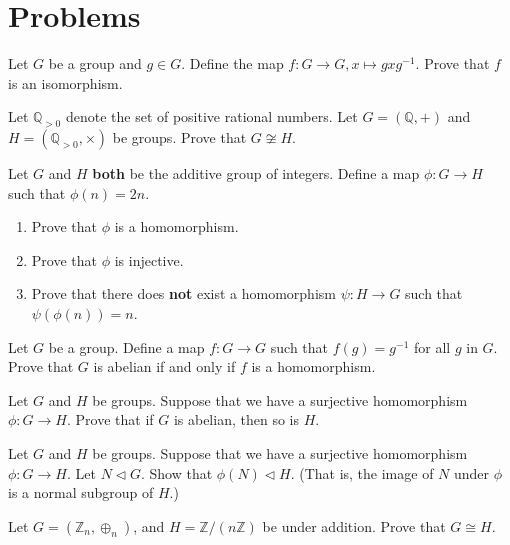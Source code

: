 \newpage

\section{Problems}

\begin{problem}
    Let $G$ be a group and $g \in G$. Define the map $f: G \to G, x \mapsto gxg^{-1}$. Prove that $f$ is an isomorphism.
\end{problem}

\begin{problem}
    Let $\mathbb{Q}_{>0}$ denote the set of positive rational numbers. Let $G = (\mathbb{Q}, +)$ and $H = (\mathbb{Q}_{>0}, \times)$ be groups. Prove that $G \not\cong H$.
\end{problem}

\begin{problem}
    Let $G$ and $H$ \textbf{both} be the additive group of integers. Define a map $\phi: G \to H$ such that $\phi(n) = 2n$.
    \begin{enumerate}[label=(\alph*)]
        \item Prove that $\phi$ is a homomorphism.
        \item Prove that $\phi$ is injective.
        \item Prove that there does \textbf{not} exist a homomorphism $\psi: H \to G$ such that $\psi(\phi(n)) = n$.
    \end{enumerate}
\end{problem}

\begin{problem}
    Let $G$ be a group. Define a map $f: G \to G$ such that $f(g) = g^{-1}$ for all $g$ in $G$. Prove that $G$ is abelian if and only if $f$ is a homomorphism.
\end{problem}

\begin{problem}
    Let $G$ and $H$ be groups. Suppose that we have a surjective homomorphism $\phi: G \to H$. Prove that if $G$ is abelian, then so is $H$.
\end{problem}

\begin{problem}
    Let $G$ and $H$ be groups. Suppose that we have a surjective homomorphism $\phi: G \to H$. Let $N \lhd G$. Show that $\phi(N) \lhd H$. (That is, the image of $N$ under $\phi$ is a normal subgroup of $H$.)
\end{problem}

\begin{problem}\label{problem-Zn-isomorphic-to-Z-by-nZ}
    Let $G = (\mathbb{Z}_n, \oplus_n)$, and $H = \mathbb{Z}/(n\mathbb{Z})$ be under addition. Prove that $G \cong H$.
\end{problem}

